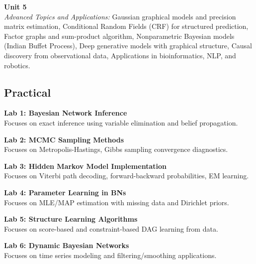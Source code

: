 \vspace{0.3cm}

\noindent\textbf{Unit 5} \\
\textit{Advanced Topics and Applications:} Gaussian graphical models and precision matrix estimation, Conditional Random Fields (CRF) for structured prediction, Factor graphs and sum-product algorithm, Nonparametric Bayesian models (Indian Buffet Process), Deep generative models with graphical structure, Causal discovery from observational data, Applications in bioinformatics, NLP, and robotics.

\newpage

\subsection*{Practical}
\noindent\textbf{Lab 1: Bayesian Network Inference} \\
Focuses on exact inference using variable elimination and belief propagation.

\vspace{0.2cm}

\noindent\textbf{Lab 2: MCMC Sampling Methods} \\
Focuses on Metropolis-Hastings, Gibbs sampling convergence diagnostics.

\vspace{0.2cm}

\noindent\textbf{Lab 3: Hidden Markov Model Implementation} \\
Focuses on Viterbi path decoding, forward-backward probabilities, EM learning.

\vspace{0.2cm}

\noindent\textbf{Lab 4: Parameter Learning in BNs} \\
Focuses on MLE/MAP estimation with missing data and Dirichlet priors.

\vspace{0.2cm}

\noindent\textbf{Lab 5: Structure Learning Algorithms} \\
Focuses on score-based and constraint-based DAG learning from data.

\vspace{0.2cm}

\noindent\textbf{Lab 6: Dynamic Bayesian Networks} \\
Focuses on time series modeling and filtering/smoothing applications.

\vspace{0.2cm}

